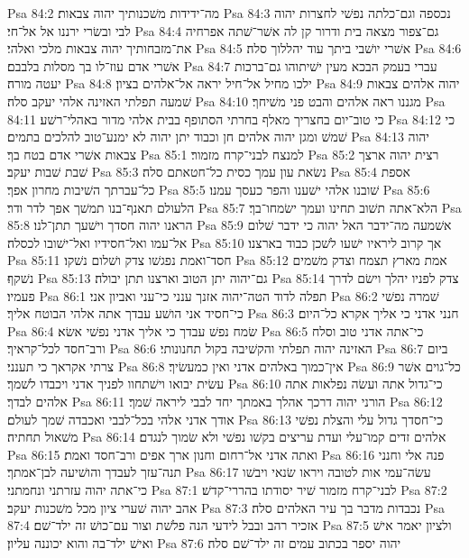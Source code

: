 Psa 84:2  מה־ידידות משׁכנותיך יהוה צבאות׃
Psa 84:3  נכספה וגם־כלתה נפשׁי לחצרות יהוה לבי ובשׂרי ירננו אל אל־חי׃
Psa 84:4  גם־צפור מצאה בית ודרור קן לה אשׁר־שׁתה אפרחיה את־מזבחותיך יהוה צבאות מלכי ואלהי׃
Psa 84:5  אשׁרי יושׁבי ביתך עוד יהללוך סלה׃
Psa 84:6  אשׁרי אדם עוז־לו בך מסלות בלבבם׃
Psa 84:7  עברי בעמק הבכא מעין ישׁיתוהו גם־ברכות יעטה מורה׃
Psa 84:8  ילכו מחיל אל־חיל יראה אל־אלהים בציון׃
Psa 84:9  יהוה אלהים צבאות שׁמעה תפלתי האזינה אלהי יעקב סלה׃
Psa 84:10  מגננו ראה אלהים והבט פני משׁיחך׃
Psa 84:11  כי טוב־יום בחצריך מאלף בחרתי הסתופף בבית אלהי מדור באהלי־רשׁע׃
Psa 84:12  כי שׁמשׁ ומגן יהוה אלהים חן וכבוד יתן יהוה לא ימנע־טוב להלכים בתמים׃
Psa 84:13  יהוה צבאות אשׁרי אדם בטח בך׃
Psa 85:1  למנצח לבני־קרח מזמור׃
Psa 85:2  רצית יהוה ארצך שׁבת שׁבות יעקב׃
Psa 85:3  נשׂאת עון עמך כסית כל־חטאתם סלה׃
Psa 85:4  אספת כל־עברתך השׁיבות מחרון אפך׃
Psa 85:5  שׁובנו אלהי ישׁענו והפר כעסך עמנו׃
Psa 85:6  הלעולם תאנף־בנו תמשׁך אפך לדר ודר׃
Psa 85:7  הלא־אתה תשׁוב תחינו ועמך ישׂמחו־בך׃
Psa 85:8  הראנו יהוה חסדך וישׁעך תתן־לנו׃
Psa 85:9  אשׁמעה מה־ידבר האל יהוה כי ידבר שׁלום אל־עמו ואל־חסידיו ואל־ישׁובו לכסלה׃
Psa 85:10  אך קרוב ליראיו ישׁעו לשׁכן כבוד בארצנו׃
Psa 85:11  חסד־ואמת נפגשׁו צדק ושׁלום נשׁקו׃
Psa 85:12  אמת מארץ תצמח וצדק משׁמים נשׁקף׃
Psa 85:13  גם־יהוה יתן הטוב וארצנו תתן יבולה׃
Psa 85:14  צדק לפניו יהלך וישׂם לדרך פעמיו׃
Psa 86:1  תפלה לדוד הטה־יהוה אזנך ענני כי־עני ואביון אני׃
Psa 86:2  שׁמרה נפשׁי כי־חסיד אני הושׁע עבדך אתה אלהי הבוטח אליך׃
Psa 86:3  חנני אדני כי אליך אקרא כל־היום׃
Psa 86:4  שׂמח נפשׁ עבדך כי אליך אדני נפשׁי אשׂא׃
Psa 86:5  כי־אתה אדני טוב וסלח ורב־חסד לכל־קראיך׃
Psa 86:6  האזינה יהוה תפלתי והקשׁיבה בקול תחנונותי׃
Psa 86:7  ביום צרתי אקראך כי תענני׃
Psa 86:8  אין־כמוך באלהים אדני ואין כמעשׂיך׃
Psa 86:9  כל־גוים אשׁר עשׂית יבואו וישׁתחוו לפניך אדני ויכבדו לשׁמך׃
Psa 86:10  כי־גדול אתה ועשׂה נפלאות אתה אלהים לבדך׃
Psa 86:11  הורני יהוה דרכך אהלך באמתך יחד לבבי ליראה שׁמך׃
Psa 86:12  אודך אדני אלהי בכל־לבבי ואכבדה שׁמך לעולם׃
Psa 86:13  כי־חסדך גדול עלי והצלת נפשׁי משׁאול תחתיה׃
Psa 86:14  אלהים זדים קמו־עלי ועדת עריצים בקשׁו נפשׁי ולא שׂמוך לנגדם׃
Psa 86:15  ואתה אדני אל־רחום וחנון ארך אפים ורב־חסד ואמת׃
Psa 86:16  פנה אלי וחנני תנה־עזך לעבדך והושׁיעה לבן־אמתך׃
Psa 86:17  עשׂה־עמי אות לטובה ויראו שׂנאי ויבשׁו כי־אתה יהוה עזרתני ונחמתני׃
Psa 87:1  לבני־קרח מזמור שׁיר יסודתו בהררי־קדשׁ׃
Psa 87:2  אהב יהוה שׁערי ציון מכל משׁכנות יעקב׃
Psa 87:3  נכבדות מדבר בך עיר האלהים סלה׃
Psa 87:4  אזכיר רהב ובבל לידעי הנה פלשׁת וצור עם־כושׁ זה ילד־שׁם׃
Psa 87:5  ולציון יאמר אישׁ ואישׁ ילד־בה והוא יכוננה עליון׃
Psa 87:6  יהוה יספר בכתוב עמים זה ילד־שׁם סלה׃
